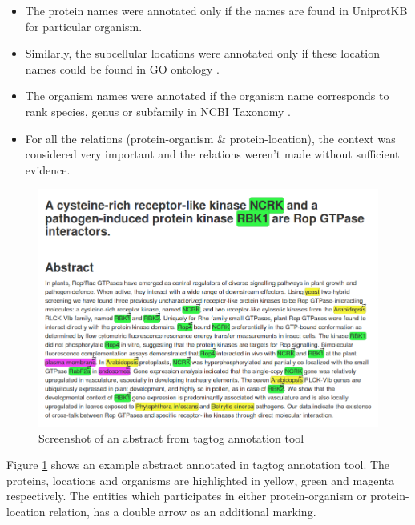 \begin{itemize}

\item The protein names were annotated only if the names are found in UniprotKB \cite{magrane2011uniprot} for particular organism.

\item Similarly, the subcellular locations were annotated only if these location names could be found in GO ontology \cite{ashburner2000gene}.

\item The organism names were annotated if the organism name corresponds to rank species, genus or subfamily in NCBI Taxonomy \cite{ncbiTaxonomy}.

\item For all the relations (protein-organism \& protein-location), the context was considered very important and the relations weren't made without sufficient evidence.

\end{itemize}


\begin{figure}
\includegraphics[scale=0.4]{figures/tagtog_screenshot.png}
\caption{Screenshot of an abstract from tagtog annotation tool}\label{fig:tagtogScreenshot}
\end{figure}

Figure \ref{fig:tagtogScreenshot} shows an example abstract annotated in tagtog annotation tool. The proteins, locations and organisms are highlighted in yellow, green and magenta respectively. The entities which participates in either protein-organism or protein-location relation, has a double arrow as an additional marking.

